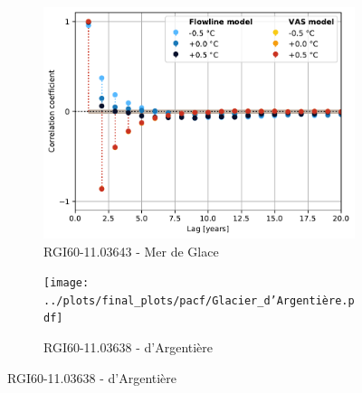 \begin{figure}[htp]
        \begin{subfigure}[b]{0.48\textwidth}
          \caption{RGI60-11.03643 - Mer de Glace}
          \label{fig:pacf:mer_de_glace}
          \centering
          \includegraphics[width=\textwidth]{../plots/final_plots/pacf/Mer_de_Glace.pdf}
        \end{subfigure}
        \hfill
        \begin{subfigure}[b]{0.48\textwidth}
          \caption{RGI60-11.03638 - d'Argentière}
          \label{fig:pacf:glacier_d_argentiere}
          \centering
          \texttt{[image: ../plots/final\_plots/pacf/Glacier\_d'Argentière.pdf]}
        \end{subfigure}


\end{figure}
